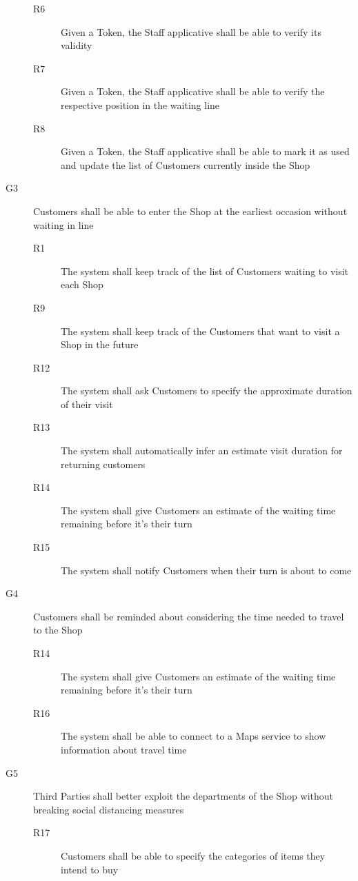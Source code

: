 \begin{description}
\begin{description}
              \item [R6] Given a Token, the Staff applicative shall be able to verify its validity
              \item [R7] Given a Token, the Staff applicative shall be able to verify the respective position in the waiting line
              \item [R8] Given a Token, the Staff applicative shall be able to mark it as used and update the list of Customers currently inside the Shop
          \end{description}
    \item [G3]  Customers shall be able to enter the Shop at the earliest occasion without waiting in line
          \begin{description}
              \item [R1] The system shall keep track of the list of Customers waiting to visit each Shop
              \item [R9] The system shall keep track of the Customers that want to visit a Shop in the future
              \item [R12] The system shall ask Customers to specify the approximate duration of their visit
              \item [R13] The system shall automatically infer an estimate visit duration for returning customers
              \item [R14] The system shall give Customers an estimate of the waiting time remaining before it's their turn
              \item [R15] The system shall notify Customers when their turn is about to come
          \end{description}
    \item [G4]  Customers shall be reminded about considering the time needed to travel to the Shop
          \begin{description}
              \item [R14] The system shall give Customers an estimate of the waiting time remaining before it's their turn
              \item [R16] The system shall be able to connect to a Maps service to show information about travel time
          \end{description}
    \item [G5]  Third Parties shall better exploit the departments of the Shop without breaking social distancing measures
          \begin{description}
              \item [R17] Customers shall be able to specify the categories of items they intend to buy

\end{description}
\end{description}
